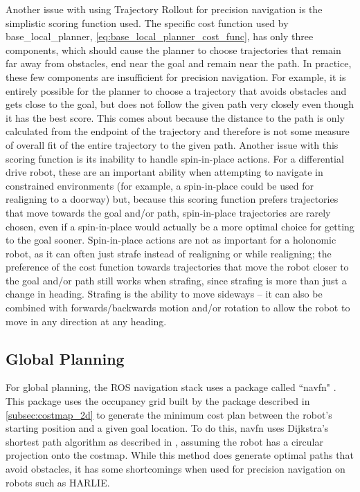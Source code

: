 Another issue with using Trajectory Rollout for precision navigation is the simplistic scoring function used. The specific cost function used by base\_local\_planner, \eqref{eq:base_local_planner_cost_func}, has only three components, which should cause the planner to choose trajectories that remain far away from obstacles, end near the goal and remain near the path. In practice, these few components are insufficient for precision navigation. For example, it is entirely possible for the planner to choose a trajectory that avoids obstacles and gets close to the goal, but does not follow the given path very closely even though it has the best score. This comes about because the distance to the path is only calculated from the endpoint of the trajectory and therefore is not some measure of overall fit of the entire trajectory to the given path. Another issue with this scoring function is its inability to handle spin-in-place actions. For a differential drive robot, these are an important ability when attempting to navigate in constrained environments (for example, a spin-in-place could be used for realigning to a doorway) but, because this scoring function prefers trajectories that move towards the goal and/or path, spin-in-place trajectories are rarely chosen, even if a spin-in-place would actually be a more optimal choice for getting to the goal sooner. Spin-in-place actions are not as important for a holonomic robot, as it can often just strafe instead of realigning or while realigning; the preference of the cost function towards trajectories that move the robot closer to the goal and/or path still works when strafing, since strafing is more than just a change in heading. Strafing is the ability to move sideways -- it can also be combined with forwards/backwards motion and/or rotation to allow the robot to move in any direction at any heading.

\subsection{Global Planning}\label{subsec:navfn}

For global planning, the ROS navigation stack uses a package called ``navfn" \autocite{NavFnWiki}. This package uses the occupancy grid built by the package described in \autoref{subsec:costmap_2d} to generate the minimum cost plan between the robot's starting position and a given goal location. To do this, navfn uses Dijkstra's shortest path algorithm as described in \autocite{Lav06}, assuming the robot has a circular projection onto the costmap. While this method does generate optimal paths that avoid obstacles, it has some shortcomings when used for precision navigation on robots such as HARLIE.

